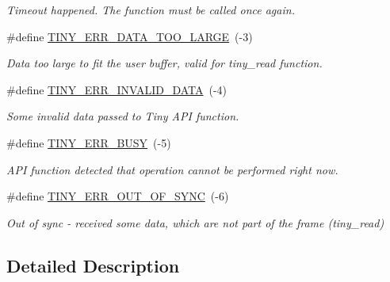 \begin{DoxyCompactItemize}
\begin{DoxyCompactList}\small\item\em Timeout happened. The function must be called once again. \end{DoxyCompactList}\item 
\hypertarget{group__ERROR__FLAGS_ga7bbe7440d11ad304b0af68e011f4eab7}{}\#define \hyperlink{group__ERROR__FLAGS_ga7bbe7440d11ad304b0af68e011f4eab7}{T\+I\+N\+Y\+\_\+\+E\+R\+R\+\_\+\+D\+A\+T\+A\+\_\+\+T\+O\+O\+\_\+\+L\+A\+R\+G\+E}~(-\/3)\label{group__ERROR__FLAGS_ga7bbe7440d11ad304b0af68e011f4eab7}

\begin{DoxyCompactList}\small\item\em Data too large to fit the user buffer, valid for tiny\+\_\+read function. \end{DoxyCompactList}\item 
\hypertarget{group__ERROR__FLAGS_ga541a9e67a84e39595ad647d641c4df2e}{}\#define \hyperlink{group__ERROR__FLAGS_ga541a9e67a84e39595ad647d641c4df2e}{T\+I\+N\+Y\+\_\+\+E\+R\+R\+\_\+\+I\+N\+V\+A\+L\+I\+D\+\_\+\+D\+A\+T\+A}~(-\/4)\label{group__ERROR__FLAGS_ga541a9e67a84e39595ad647d641c4df2e}

\begin{DoxyCompactList}\small\item\em Some invalid data passed to Tiny A\+P\+I function. \end{DoxyCompactList}\item 
\hypertarget{group__ERROR__FLAGS_ga9b3e170e1c6ce269f216ef4a1ac61995}{}\#define \hyperlink{group__ERROR__FLAGS_ga9b3e170e1c6ce269f216ef4a1ac61995}{T\+I\+N\+Y\+\_\+\+E\+R\+R\+\_\+\+B\+U\+S\+Y}~(-\/5)\label{group__ERROR__FLAGS_ga9b3e170e1c6ce269f216ef4a1ac61995}

\begin{DoxyCompactList}\small\item\em A\+P\+I function detected that operation cannot be performed right now. \end{DoxyCompactList}\item 
\hypertarget{group__ERROR__FLAGS_gae1949de45d9c478830dad9c9b996193a}{}\#define \hyperlink{group__ERROR__FLAGS_gae1949de45d9c478830dad9c9b996193a}{T\+I\+N\+Y\+\_\+\+E\+R\+R\+\_\+\+O\+U\+T\+\_\+\+O\+F\+\_\+\+S\+Y\+N\+C}~(-\/6)\label{group__ERROR__FLAGS_gae1949de45d9c478830dad9c9b996193a}

\begin{DoxyCompactList}\small\item\em Out of sync -\/ received some data, which are not part of the frame (tiny\+\_\+read) \end{DoxyCompactList}\end{DoxyCompactItemize}


\subsection{Detailed Description}
